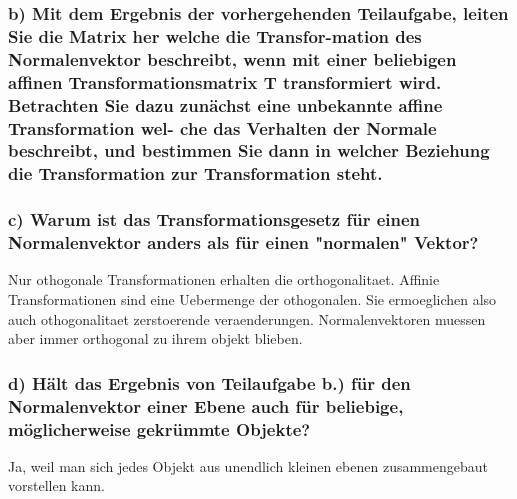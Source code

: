 \documentclass[a4paper,headings=small]{scrartcl}
\numberwithin{equation}{section} %
\numberwithin{figure}{section}   %
\begin{document}
\subsubsection{b) Mit dem Ergebnis der vorhergehenden Teilaufgabe, leiten Sie die Matrix her welche die Transfor-mation des Normalenvektor beschreibt, wenn mit einer beliebigen affinen Transformationsmatrix
T transformiert wird. Betrachten Sie dazu zunächst eine unbekannte affine Transformation wel-
che das Verhalten der Normale beschreibt, und bestimmen Sie dann in welcher Beziehung die
Transformation zur Transformation steht.}

\subsubsection{c) Warum ist das Transformationsgesetz für einen Normalenvektor anders als für einen "normalen" Vektor?}
Nur othogonale Transformationen erhalten die orthogonalitaet.
Affinie Transformationen sind eine Uebermenge der othogonalen.
Sie ermoeglichen also auch othogonalitaet zerstoerende veraenderungen.
Normalenvektoren muessen aber immer orthogonal zu ihrem objekt blieben.

\subsubsection{d) Hält das Ergebnis von Teilaufgabe b.) für den Normalenvektor einer Ebene auch für beliebige, möglicherweise gekrümmte Objekte?}
Ja, weil man sich jedes Objekt aus unendlich kleinen ebenen zusammengebaut vorstellen kann.
\end{document}

